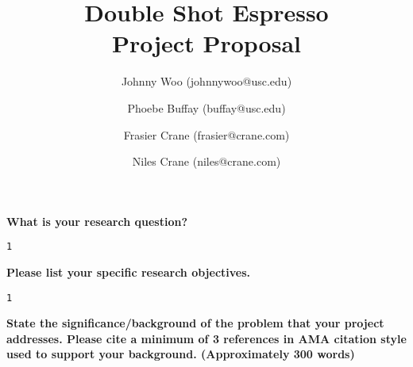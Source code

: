\documentclass[11pt]{article}
\title{\vspace{3in}Double Shot Espresso
\\{\small Project Proposal}}
\author[]{Johnny Woo (johnnywoo@usc.edu)}\author[]{Phoebe Buffay (buffay@usc.edu)}\author[]{Frasier Crane (frasier@crane.com)}\author[]{Niles Crane (niles@crane.com)}
\affil[]{}
\date{}
\begin{document}
\maketitle
\thispagestyle{fancyfirst}
\pagebreak

{\bfseries What is your research question?}
\begin{lstlisting}[mathescape]
1
\end{lstlisting}
\hfill

{\bfseries Please list your specific research objectives.}
\begin{lstlisting}[mathescape]
1
\end{lstlisting}
\hfill

{\bfseries State the significance/background of the problem that your project addresses. Please cite a minimum of 3 references in AMA citation style used to support your background. (Approximately 300 words)}
\end{document}
